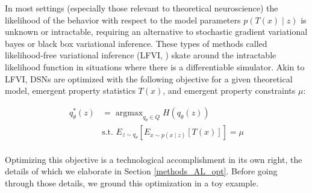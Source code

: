 \documentclass[11pt]{article}
\DeclareMathOperator*{\argmax}{argmax}
\begin{document}
In most settings (especially those relevant to theoretical neuroscience) the likelihood of the behavior with respect to the model parameters $p(T(x) \mid z)$ is unknown or intractable, requiring an alternative to stochastic gradient variational bayes \cite{kingma2013auto} or black box variational inference\cite{ranganath2014black}.  These types of methods called likelihood-free variational inference (LFVI, \cite{tran2017hierarchical}) skate around the intractable likelihood function in situations where there is a differentiable simulator. Akin to LFVI, DSNs are optimized with the following objective for a given theoretical model, emergent property statistics $T(x)$, and emergent property constraints $\mu$:

\begin{equation}
\begin{split}
q_\theta^*(z) &= \argmax_{q_\theta \in Q} H(q_\theta(z)) \\
 &  \text{s.t.  } E_{z \sim q_\theta}\left[ E_{x\sim p(x \mid z)}\left[T(x)\right] \right] = \mu \\
 \end{split}
\end{equation}

Optimizing this objective is a technological accomplishment in its own right, the details of which we elaborate in Section \ref{methods_AL_opt}.  Before going through those details, we ground this optimization in a toy example.
\end{document}

